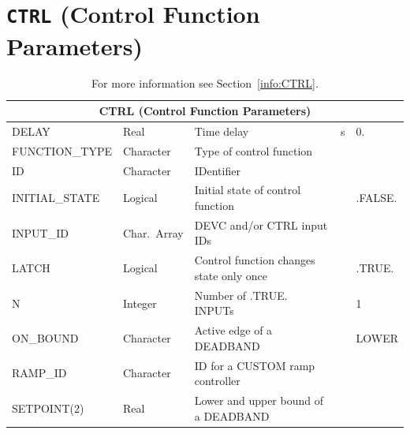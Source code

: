\documentclass[11pt]{book}
\begin{document}
\vspace{\baselineskip}

\vfill


\section{\texorpdfstring{{\tt CTRL}}{CTRL} (Control Function Parameters)}

\hspace{1in}

\begin{table}[H]
\caption{For more information see Section~\ref{info:CTRL}.}\label{tbl:CTRL}
\noindent
\begin{tabular*}{6.5in}{@{\extracolsep\fill}|l|l|l|l|l|}
\hline
\multicolumn{5}{|c|}{{\ct CTRL} (Control Function Parameters)} \\ \hline \hline
{\ct DELAY}          & Real         & Time delay                                  & s  &  0.                       \\ \hline
{\ct FUNCTION\_TYPE} & Character    & Type of control function                    &    &                           \\ \hline
{\ct ID}             & Character    & IDentifier                                  &    &                           \\ \hline
{\ct INITIAL\_STATE} & Logical      & Initial state of control function           &    & {\ct .FALSE.}             \\ \hline
{\ct INPUT\_ID}      & Char.~Array  & DEVC and/or CTRL input {\ct ID}s            &    &                           \\ \hline
{\ct LATCH}          & Logical      & Control function changes state only once    &    & {\ct .TRUE.}              \\ \hline
{\ct N}              & Integer      & Number of .TRUE. {\ct INPUT}s               &    &   1                       \\ \hline
{\ct ON\_BOUND}      & Character    & Active edge of a {\ct DEADBAND}             &    & {\ct LOWER}               \\ \hline
{\ct RAMP\_ID}       & Character    & {\ct ID} for a {\ct CUSTOM} ramp controller &    &                           \\ \hline
{\ct SETPOINT(2)}    & Real         & Lower and upper bound of a {\ct DEADBAND}   &    &                           \\ \hline
\end{tabular*}
\end{table}
\end{document}
